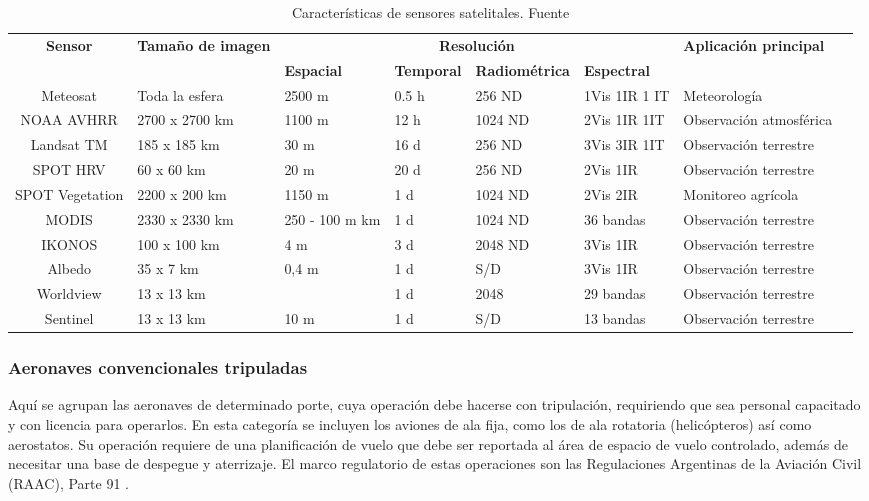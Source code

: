 \begin{table}[H]
    \centering
    \caption{Características de sensores satelitales. Fuente \cite{noauthor_3_nodate}}
    \begin{tabular}{c p{20mm} p{15mm} p{15mm} p{25mm} p{20mm}p{20mm} p{20mm}|}
        \hline
        \hline
        \textbf{Sensor} & \textbf{Tamaño de imagen} & \multicolumn{4}{c}{\textbf{Resolución}} & \textbf{Aplicación principal} \\
        & & \textbf{Espacial} & \textbf{Temporal} & \textbf{Radiométrica} & \textbf{Espectral}  &\\
        \hline \hline
        Meteosat & Toda la esfera & 	2500 m 	& 0.5 h 	& 256 ND 	& 1Vis 1IR 1 IT & Meteorología\\
        \hline
        NOAA AVHRR & 2700 x 2700 km	& 1100 m 	 	& 12 h 	& 1024 ND 	& 2Vis 1IR 1IT & Observación atmosférica\\
        \hline
        Landsat TM 	& 185 x 185 km & 30 m 	 	& 16 d 	& 256 ND 	& 3Vis 3IR 1IT & Observación terrestre\\
        \hline
        SPOT HRV & 60 x 60 km	& 20 m 	 	& 20 d	& 256 ND 	& 2Vis 1IR & Observación terrestre\\
        \hline
        SPOT Vegetation & 2200 x 200 km	& 1150 m 	 	& 1 d	& 1024 ND 	& 2Vis 2IR & Monitoreo agrícola\\
        \hline
        MODIS & 2330 x 2330 km	& 250 - 100 m 	 km 	& 1 d	& 1024 ND 	& 36 bandas & Observación terrestre\\
        \hline
        IKONOS & 100 x 100 km	& 4 m 	 	& 3 d 	& 2048 ND 	& 3Vis 1IR & Observación terrestre\\
        \hline
        Albedo & 35 x 7 km & 0,4 m  & 1 d & S/D & 3Vis 1IR & Observación terrestre\\
        \hline
         Worldview & 13 x 13 km &   & 1 d & 2048 & 29 bandas & Observación terrestre\\
        \hline
         Sentinel & 13 x 13 km &  10 m & 1 d & S/D & 13 bandas & Observación terrestre\\
        \hline
        \hline
    \end{tabular}

\label{Satelites}
\end{table}
\subsubsection{Aeronaves convencionales tripuladas}
Aquí se agrupan las aeronaves de determinado porte, cuya operación debe hacerse con tripulación, requiriendo que sea personal capacitado y con licencia para operarlos. En esta categoría se incluyen los aviones de ala fija, como los de ala rotatoria (helicópteros) así como aerostatos. Su operación requiere de una planificación de vuelo que debe ser reportada al área de espacio de vuelo controlado, además de necesitar una base de despegue y aterrizaje. El marco regulatorio de estas operaciones son las Regulaciones Argentinas de la Aviación Civil (RAAC), Parte 91 \cite{noauthor_infoleg_nodate-1}.

